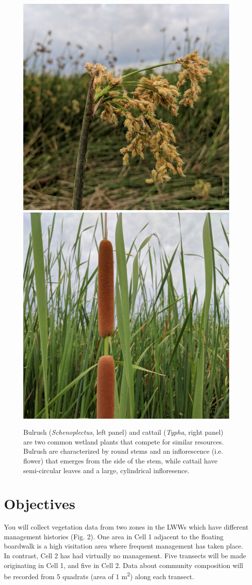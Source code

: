 \documentclass[11pt,]{article}
\begin{document}
\begin{figure}
\includegraphics[width=0.5\linewidth]{../_chapter_materials/bulrush} \includegraphics[width=0.5\linewidth]{../_chapter_materials/cattail} \caption{Bulrush (\textit{Schenoplectus}, left panel) and cattail (\textit{Typha}, right panel) are two common wetland plants that compete for similar resources. Bulrush are characterized by round stems and an inflorescence (i.e. flower) that emerges from the side of the stem, while cattail have semi-circular leaves and a large, cylindrical infloresence.}\label{fig:organisms}
\end{figure}

\hypertarget{objectives}{%
\section{Objectives}\label{objectives}}

You will collect vegetation data from two zones in the LWWs which have
different management histories (Fig. 2). One area in Cell 1 adjacent to
the floating boardwalk is a high visitation area where frequent
management has taken place. In contrast, Cell 2 has had virtually no
management. Five transects will be made originating in Cell 1, and five
in Cell 2. Data about community composition will be recorded from 5
quadrats (area of 1 m\textsuperscript{2}) along each transect.
\end{document}

